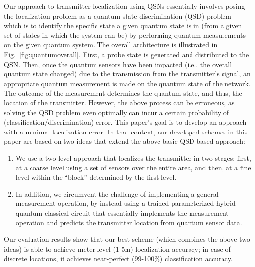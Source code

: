 Our approach to
transmitter localization using QSNs essentially involves posing
the localization problem as a quantum state discrimination
(QSD) problem~\cite{bergou-review-2007} which is to identify the specific state a given
quantum state is in (from a given set of states in which the
system can be) by performing quantum measurements on the
given quantum system. The overall architecture is illustrated in
Fig.~\ref{fig:quantumoverall}. 
First, a probe state is generated and distributed to the
QSN. Then, once the quantum sensors have been impacted
(i.e., the overall quantum state changed) due to the transmission
from the transmitter’s signal, an appropriate quantum measurement 
is made on the quantum state of the network.
The outcome of the measurement determines the quantum
state, and thus, the location of the transmitter. 
However, the
above process can be erroneous, as solving 
the QSD problem even optimally
can incur a certain probability of (classification/discrimination)  error.
This paper’s goal is to develop an approach with a 
minimal localization error. 
In that context, our
developed schemes in this paper are based on two ideas that extend
the above basic QSD-based approach: 
\begin{enumerate}
    \item We use a two-level approach
that localizes the transmitter in two stages: first, at a coarse level
using a set of sensors over the entire area, and then, at a fine level
within the ``block'' determined by the first level. 
\item In addition, we circumvent the challenge of implementing a general
measurement operation, by instead using a trained parameterized 
hybrid quantum-classical circuit that essentially implements the 
measurement operation and predicts the transmitter location from
quantum sensor data.
\end{enumerate}
Our evaluation results show that our best scheme (which combines the above two ideas) is able to achieve meter-level (1-5m) localization accuracy; in case of discrete locations, it achieves near-perfect (99-100\%) classification accuracy. 

